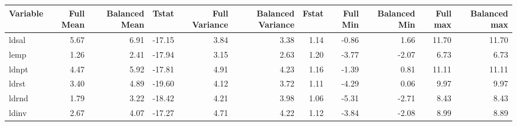 \begin{tabular}{lrrrrrrrrrr}
  \hline
Variable & Full Mean & Balanced Mean & Tstat & Full Variance & Balanced Variance & Fstat & Full Min & Balanced Min & Full max & Balanced max \\ 
  \hline
ldsal & 5.67 & 6.91 & -17.15 & 3.84 & 3.38 & 1.14 & -0.86 & 1.66 & 11.70 & 11.70 \\ 
  lemp & 1.26 & 2.41 & -17.94 & 3.15 & 2.63 & 1.20 & -3.77 & -2.07 & 6.73 & 6.73 \\ 
  ldnpt & 4.47 & 5.92 & -17.81 & 4.91 & 4.23 & 1.16 & -1.39 & 0.81 & 11.11 & 11.11 \\ 
  ldrst & 3.40 & 4.89 & -19.60 & 4.12 & 3.72 & 1.11 & -4.29 & 0.06 & 9.97 & 9.97 \\ 
  ldrnd & 1.79 & 3.22 & -18.42 & 4.21 & 3.98 & 1.06 & -5.31 & -2.71 & 8.43 & 8.43 \\ 
  ldinv & 2.67 & 4.07 & -17.27 & 4.71 & 4.22 & 1.12 & -3.84 & -2.08 & 8.99 & 8.89 \\ 
   \hline
\end{tabular}
